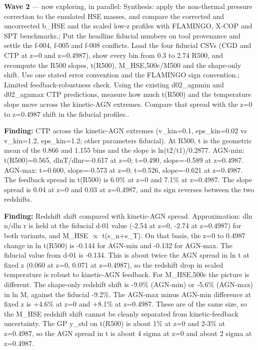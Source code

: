 \documentclass[11pt,a4paper]{article}
\begin{document}
\textbf{Wave 2} --- now exploring, in parallel: Synthesis: apply the non-thermal pressure correction to the emulated HSE masses, and compare the corrected and uncorrected b\_HSE and the scaled low-z profiles with FLAMINGO, X-COP and SPT benchmarks.; Put the headline fiducial numbers on tool provenance and settle the f-004, f-005 and f-008 conflicts. Load the four fiducial CSVs (CGD and CTP at z=0 and z=0.4987), show every bin from 0.3 to 2.74 R500, and recompute the R500 slopes, t(R500), M\_HSE,500c/M500 and the shape-only shift. Use one stated error convention and the FLAMINGO sign convention.; Limited feedback-robustness check. Using the existing d02\_agnmin and d02\_agnmax CTP predictions, measure how much t(R500) and the temperature slope move across the kinetic-AGN extremes. Compare that spread with the z=0 to z=0.4987 shift in the fiducial profiles..

\textbf{Finding:} CTP across the kinetic-AGN extremes (v\_kin=0.1, eps\_kin=0.02 vs v\_kin=1.2, eps\_kin=1.2; other parameters fiducial). At R500, t is the geometric mean of the 0.866 and 1.155 bins and the slope is ln(t2/t1)/0.2877. AGN-min: t(R500)=0.565, dlnT/dlnr=-0.617 at z=0; t=0.490, slope=-0.589 at z=0.4987. AGN-max: t=0.600, slope=-0.573 at z=0; t=0.526, slope=-0.621 at z=0.4987. The feedback spread in t(R500) is 6.0\% at z=0 and 7.1\% at z=0.4987. The slope spread is 0.04 at z=0 and 0.03 at z=0.4987, and its sign reverses between the two redshifts.

\textbf{Finding:} Redshift shift compared with kinetic-AGN spread. Approximation: dln n/dln r is held at the fiducial d-01 value (-2.54 at z=0, -2.74 at z=0.4987) for both variants, and M\_HSE $\propto$ t(s\_n+s\_T). On that basis, the z=0 to 0.4987 change in ln t(R500) is -0.144 for AGN-min and -0.132 for AGN-max. The fiducial value from d-01 is -0.134. This is about twice the AGN spread in ln t at fixed z (0.060 at z=0, 0.071 at z=0.4987), so the redshift drop in scaled temperature is robust to kinetic-AGN feedback. For M\_HSE,500c the picture is different. The shape-only redshift shift is -9.0\% (AGN-min) or -5.6\% (AGN-max) in ln M, against the fiducial -9.2\%. The AGN-max minus AGN-min difference at fixed z is +4.6\% at z=0 and +8.1\% at z=0.4987. These are of the same size, so the M\_HSE redshift shift cannot be cleanly separated from kinetic-feedback uncertainty. The GP y\_std on t(R500) is about 1\% at z=0 and 2-3\% at z=0.4987, so the AGN spread in t is about 4 sigma at z=0 and about 2 sigma at z=0.4987.
\end{document}
